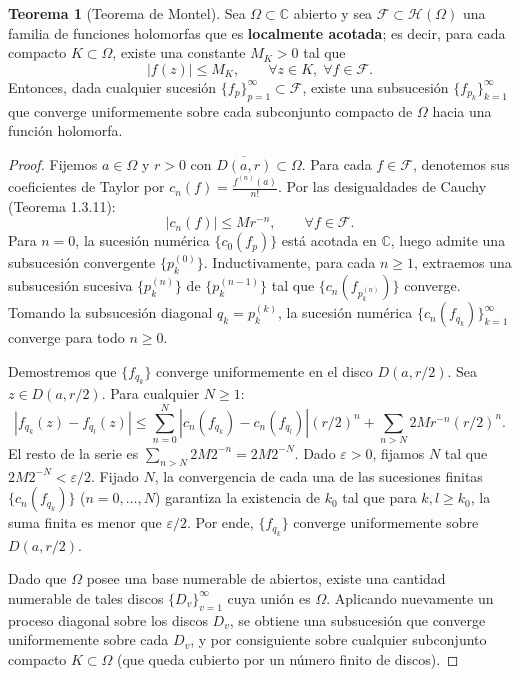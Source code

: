\documentclass[11pt,a4paper]{article}
\theoremstyle{definition}
\newtheorem{teorema}{Teorema}[section]
\theoremstyle{remark}
\numberwithin{equation}{section}
\begin{document}
\begin{teorema}[Teorema de Montel]
Sea $\Omega \subset \mathbb{C}$ abierto y sea $\mathcal{F} \subset \mathcal{H}(\Omega)$ una familia de funciones holomorfas que es \textbf{localmente acotada}; es decir, para cada compacto $K \subset \Omega$, existe una constante $M_K > 0$ tal que
\begin{equation}
|f(z)| \le M_K, \qquad \forall z \in K, \; \forall f \in \mathcal{F}.
\end{equation}
Entonces, dada cualquier sucesión $\{f_p\}_{p=1}^\infty \subset \mathcal{F}$, existe una subsucesión $\{f_{p_k}\}_{k=1}^\infty$ que converge uniformemente sobre cada subconjunto compacto de $\Omega$ hacia una función holomorfa.
\end{teorema}
\begin{proof}
Fijemos $a \in \Omega$ y $r > 0$ con $\overline{D(a,r)} \subset \Omega$. Para cada $f \in \mathcal{F}$, denotemos sus coeficientes de Taylor por $c_n(f) = \frac{f^{(n)}(a)}{n!}$. Por las desigualdades de Cauchy (Teorema 1.3.11):
\[
|c_n(f)| \le M r^{-n}, \qquad \forall f \in \mathcal{F}.
\]
Para $n = 0$, la sucesión numérica $\{c_0(f_p)\}$ está acotada en $\mathbb{C}$, luego admite una subsucesión convergente $\{p_k^{(0)}\}$. Inductivamente, para cada $n \ge 1$, extraemos una subsucesión sucesiva $\{p_k^{(n)}\}$ de $\{p_k^{(n-1)}\}$ tal que $\{c_n(f_{p_k^{(n)}})\}$ converge.
Tomando la subsucesión diagonal $q_k = p_k^{(k)}$, la sucesión numérica $\{c_n(f_{q_k})\}_{k=1}^\infty$ converge para todo $n \ge 0$.

Demostremos que $\{f_{q_k}\}$ converge uniformemente en el disco $D(a, r/2)$. Sea $z \in D(a, r/2)$. Para cualquier $N \ge 1$:
\[
|f_{q_k}(z) - f_{q_l}(z)| \le \sum_{n=0}^N |c_n(f_{q_k}) - c_n(f_{q_l})| (r/2)^n + \sum_{n > N} 2M r^{-n} (r/2)^n.
\]
El resto de la serie es $\sum_{n > N} 2M 2^{-n} = 2M 2^{-N}$. Dado $\varepsilon > 0$, fijamos $N$ tal que $2M 2^{-N} < \varepsilon/2$. Fijado $N$, la convergencia de cada una de las sucesiones finitas $\{c_n(f_{q_k})\}$ ($n=0, \dots, N$) garantiza la existencia de $k_0$ tal que para $k, l \ge k_0$, la suma finita es menor que $\varepsilon/2$. Por ende, $\{f_{q_k}\}$ converge uniformemente sobre $D(a, r/2)$.

Dado que $\Omega$ posee una base numerable de abiertos, existe una cantidad numerable de tales discos $\{D_v\}_{v=1}^\infty$ cuya unión es $\Omega$. Aplicando nuevamente un proceso diagonal sobre los discos $D_v$, se obtiene una subsucesión que converge uniformemente sobre cada $D_v$, y por consiguiente sobre cualquier subconjunto compacto $K \subset \Omega$ (que queda cubierto por un número finito de discos).
\end{proof}
\end{document}
